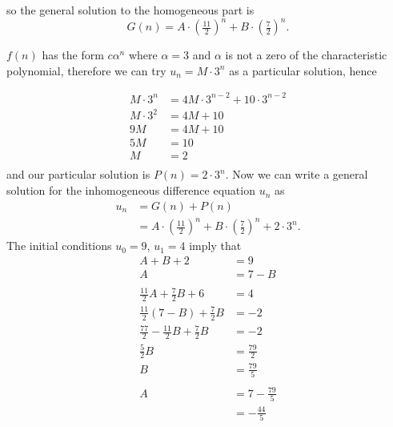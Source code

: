 \documentclass[10pt]{article}
\begin{document}
\begin{enumerate}
\begin{enumerate}
                so the general solution to the homogeneous
                part is $$G(n) = A\cdot(\tfrac{11}{2})^n + B\cdot(\tfrac{7}{2})^n.$$

                $f(n)$ has the form $c\alpha^n$ where $\alpha = 3$ and $\alpha$
                is not a zero of the characteristic polynomial, therefore we
                can try $u_n = M\cdot3^n$ as a particular solution, hence

                \begin{align*}
                    M\cdot3^n &= 4M\cdot3^{n - 2} + 10 \cdot 3^{n - 2} \\
                    M\cdot3^2 &= 4M + 10 \\
                    9M &= 4M + 10 \\
                    5M &= 10 \\
                    M &= 2 \\
                \end{align*}
                and our particular solution is $P(n) = 2\cdot3^n$.
                Now we can write a general solution for the inhomogeneous
                difference equation $u_n$ as
                \begin{align*}
                    u_n &= G(n) + P(n) \\
                        &= A\cdot(\tfrac{11}{2})^n + B\cdot(\tfrac{7}{2})^n + 2\cdot3^n.
                \end{align*}
                The initial conditions $u_0 = 9$, $u_1 = 4$ imply that
                \begin{align*}
                    A + B + 2 &= 9 \\
                    A &= 7 - B  \\
                    \\
                    \tfrac{11}{2}A + \tfrac{7}{2}B + 6 &= 4 \\
                    \tfrac{11}{2}(7 - B) + \tfrac{7}{2}B &= -2 \\
                    \tfrac{77}{2} - \tfrac{11}{2}B + \tfrac{7}{2}B &= -2 \\
                    \tfrac{5}{2}B &= \tfrac{79}{2} \\
                    B &= \tfrac{79}{5} \\
                    \\
                    A &= 7 - \tfrac{79}{5} \\
                    &= - \tfrac{44}{5} \\

\end{align*}
\end{enumerate}
\end{enumerate}
\end{document}
